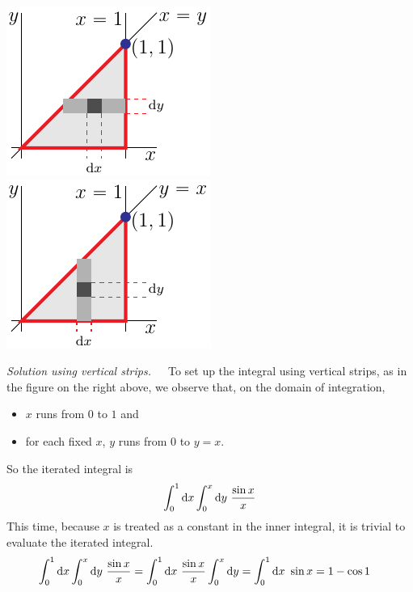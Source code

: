 \begin{eg}
\begin{efig}
\begin{center}
   \includegraphics{reverse2B.pdf}\qquad
   \includegraphics{reverse2C.pdf}
\end{center}
\end{efig}

\medskip\noindent\emph{Solution using vertical strips.}\ \ \
To set up the integral using vertical strips, as in the figure on
the right above, we observe that, on the domain of integration,
\begin{itemize}
\item
$x$ runs from $0$ to $1$ and
\item
for each fixed $x$, $y$ runs from $0$ to $y=x$.
\end{itemize}
So the iterated integral is
\begin{equation*}
\int_0^1\mathrm{d}x\int_0^x\mathrm{d}y\ \frac{\sin x}{x}
\end{equation*}
This time, because $x$ is treated as a constant in the inner integral,
it is trivial to evaluate the iterated integral.
\begin{align*}
\int_0^1\mathrm{d}x\int_0^x\mathrm{d}y\ \frac{\sin x}{x}
&=\int_0^1\mathrm{d}x\ \frac{\sin x}{x}\int_0^x\mathrm{d}y
=\int_0^1\mathrm{d}x\ \sin x
=1-\cos 1
\end{align*}
\end{eg}

